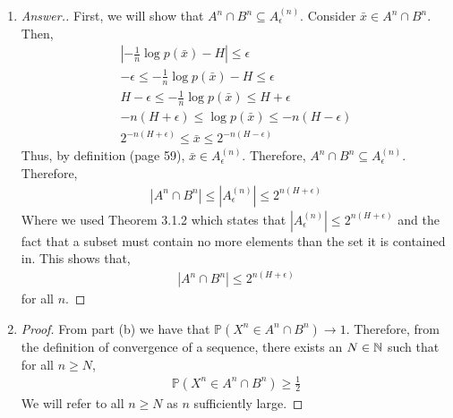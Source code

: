 \documentclass[10pt,twoside]{article}
\newcommand{\Pro}{\ensuremath{\mathbb{P}}}
\begin{document}
\begin{itemize}
\begin{enumerate}
        \item \begin{proof}[Answer.]
            First, we will show that $A^n\cap B^n\subseteq A_{\epsilon}^{(n)}$. Consider $\bar{x}\in A^n\cap B^n$. Then, 
            \begin{gather*}
                |-\frac{1}{n}\log p(\bar{x}) - H|\leq \epsilon \\
                -\epsilon \leq -\frac{1}{n}\log p(\bar{x}) - H \leq \epsilon \\
                H-\epsilon \leq -\frac{1}{n}\log p(\bar{x}) \leq H +\epsilon \\
                -n(H + \epsilon) \leq \log p(\bar{x}) \leq -n(H - \epsilon) \\
                2^{-n(H + \epsilon)} \leq \bar{x} \leq 2^{ -n(H - \epsilon)}
            \end{gather*}
            Thus, by definition (page 59), $\bar{x}\in A_{\epsilon}^{(n)}$. Therefore, $A^n\cap B^n\subseteq  A_{\epsilon}^{(n)}$. Therefore, 
            \begin{gather*}
                |A^n\cap B^n|\leq  |A_{\epsilon}^{(n)}| \leq 2^{n(H+\epsilon)}
            \end{gather*}
            Where we used Theorem 3.1.2 which states that $| A_{\epsilon}^{(n)}|\leq  2^{n(H+\epsilon)}$ and the fact that a subset must contain no more elements than the set it is contained in. This shows that, 
            \begin{gather*}
                |A^n\cap B^n|\leq  2^{n(H+\epsilon)}
            \end{gather*}
            for all $n$.
        \end{proof}
        
        \item \begin{proof}
            From part (b) we have that $\Pro(X^n\in A^n\cap B^n)\to 1$. Therefore, from the definition of convergence of a sequence, there exists an $N\in \mathbb{N}$ such that for all $n\geq N$,
            \begin{gather*}
                \Pro(X^n\in A^n\cap B^n) \geq \frac{1}{2}
            \end{gather*}
            We will refer to all $n\geq N$ as $n$ sufficiently large.
            

\end{proof}
\end{enumerate}
\end{itemize}
\end{document}
